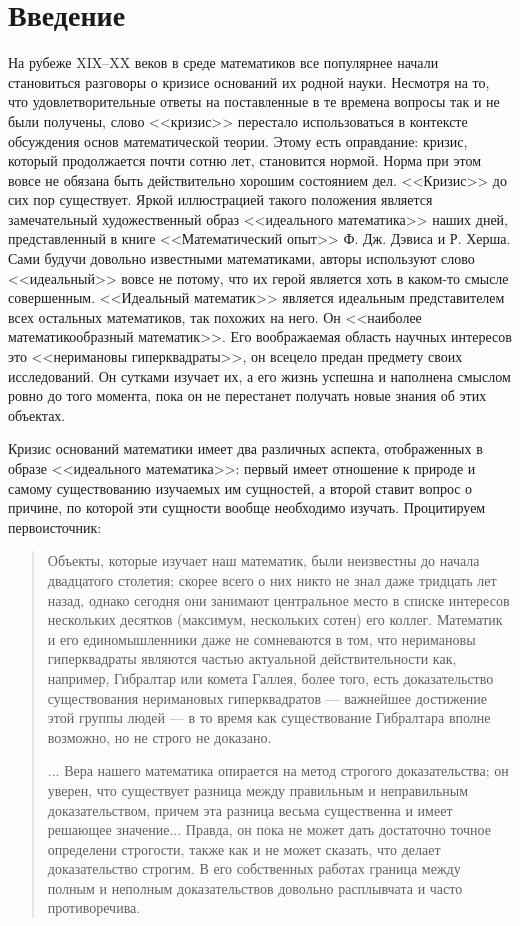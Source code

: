 \chapter*{Введение}
На рубеже XIX--XX веков в среде математиков все популярнее начали становиться разговоры о кризисе оснований их родной науки. Несмотря на то, что удовлетворительные ответы на поставленные в те времена вопросы так и не были получены, слово <<кризис>> перестало использоваться в контексте обсуждения основ математической теории. Этому есть оправдание: кризис, который продолжается почти сотню лет, становится нормой. Норма при этом вовсе не обязана быть действительно хорошим состоянием дел. <<Кризис>> до сих пор существует. Яркой иллюстрацией такого положения является замечательный художественный образ <<идеального математика>> наших дней, представленный в книге <<Математический опыт>> Ф. Дж. Дэвиса и Р. Херша. Сами будучи довольно известными математиками, авторы используют слово <<идеальный>> вовсе не потому, что их герой является хоть в каком-то смысле совершенным. <<Идеальный математик>> является идеальным представителем всех остальных математиков, так похожих на него. Он <<наиболее математикообразный математик>>. Его воображаемая область научных интересов это <<неримановы гиперквадраты>>, он всецело предан предмету своих исследований. Он сутками изучает их, а его жизнь успешна и наполнена смыслом ровно до того момента, пока он не перестанет получать новые знания об этих объектах.

Кризис оснований математики имеет два различных аспекта, отображенных в образе <<идеального математика>>: первый имеет отношение к природе и самому существованию изучаемых им сущностей, а второй ставит вопрос о причине, по которой эти сущности вообще необходимо изучать. Процитируем первоисточник:
\begin{quotation}
  Объекты, которые изучает наш математик, были неизвестны до начала двадцатого столетия; скорее всего о них никто не знал даже тридцать лет назад, однако сегодня они занимают центральное место в списке интересов нескольких десятков (максимум, нескольких сотен) его коллег. Математик и его единомышленники даже не сомневаются в том, что неримановы гиперквадраты являются частью актуальной действительности как, например, Гибралтар или комета Галлея, более того, есть доказательство существования неримановых гиперквадратов --- важнейшее достижение этой группы людей --- в то время как существование Гибралтара вполне возможно, но не строго не доказано.

  ... Вера нашего математика опирается на метод строгого доказательства; он уверен, что существует разница между правильным и неправильным доказательством, причем эта разница весьма существенна и имеет решающее значение... Правда, он пока не может дать достаточно точное определени строгости, также как и не может сказать, что делает доказательство строгим. В его собственных работах граница между полным и неполным доказательствов довольно расплывчата и часто противоречива.
\end{quotation}

